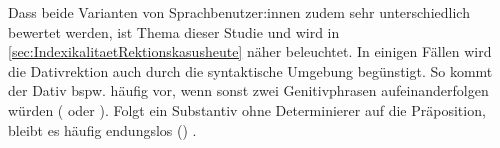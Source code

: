Dass beide Varianten von Sprachbenutzer:innen zudem sehr unterschiedlich bewertet werden, ist Thema dieser Studie und wird in \autoref{sec:IndexikalitaetRektionskasusheute} näher beleuchtet. 
In einigen Fällen wird die Dativrektion auch durch die syntaktische Umgebung begünstigt. 
So kommt der Dativ bspw. häufig vor, wenn sonst zwei Genitivphrasen aufeinanderfolgen würden ( oder ). Folgt ein Substantiv ohne Determinierer auf die Präposition, bleibt es häufig endungslos () \citep[s.][§1450--1451]{Duden2022}. 

